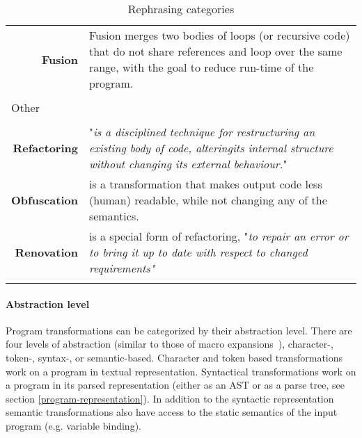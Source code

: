 \begin{longtable}{p{}p{}}
\multicolumn{1}{r}{\bf Fusion}                      & Fusion merges two bodies of loops (or recursive code) that do not share references and loop over the same range, with the goal to reduce run-time of the program.                                                                                                                                                                               \\
\\
\multicolumn{1}{l}{Other}         &                                                                                                                                                                               \\ \hline \\
\multicolumn{1}{r}{\bf Refactoring}                 & "\textit{is a disciplined technique for restructuring an existing body of code, alteringits internal structure without changing its external behaviour.}"\footnotemark                 \\
\multicolumn{1}{r}{\bf Obfuscation}                 & is a transformation that makes output code less (human) readable, while not changing any of the semantics.                                                                    \\
\multicolumn{1}{r}{\bf Renovation}                  & is a special form of refactoring, "\textit{to repair an error or to bring it up to date with respect to changed requirements"}~\cite{Visser2001} \\
\caption{Rephrasing categories} \label{table-rephrasing-categories}
\end{longtable}

\paragraph{Abstraction level}
Program transformations can be categorized by their abstraction level. There are four levels of abstraction (similar to those of macro expansions~\cite{Weise1993}), character-, token-, syntax-, or semantic-based. Character and token based transformations work on a program in textual representation. Syntactical transformations work on a program in its parsed representation (either as an AST or as a parse tree, see section \ref{program-representation}). In addition to the syntactic representation semantic transformations also have access to the static semantics of the input program (e.g. variable binding).

